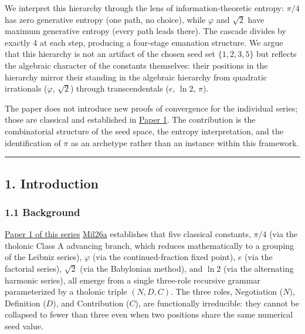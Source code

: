 \documentclass[
  11pt,
  letterpaper,
]{article}
\begin{document}
We interpret this hierarchy through the lens of information-theoretic
entropy: \(\pi/4\) has zero generative entropy (one path, no choice),
while \(\varphi\) and \(\sqrt{2}\) have maximum generative entropy
(every path leads there). The cascade divides by exactly 4 at each step,
producing a four-stage emanation structure. We argue that this hierarchy
is not an artifact of the chosen seed set \(\{1, 2, 3, 5\}\) but
reflects the algebraic character of the constants themselves: their
positions in the hierarchy mirror their standing in the algebraic
hierarchy from quadratic irrationals (\(\varphi\), \(\sqrt{2}\)) through
transcendentals (\(e\), \(\ln 2\), \(\pi\)).

The paper does not introduce new proofs of convergence for the
individual series; those are classical and established in
\href{https://github.com/baardev/truevalue/blob/main/docnav/Research/papers/1_recursive-tholonic-five-constants/1_recursive-tholonic-five-constants.pdf}{Paper
1}. The contribution is the combinatorial structure of the seed space,
the entropy interpretation, and the identification of \(\pi\) as an
archetype rather than an instance within this framework.

\begin{center}\rule{0.5\linewidth}{0.5pt}\end{center}

\subsection{1. Introduction}\label{introduction}

\subsubsection{1.1 Background}\label{background}

\href{https://github.com/baardev/truevalue/blob/main/docnav/Research/papers/1_recursive-tholonic-five-constants/1_recursive-tholonic-five-constants.pdf}{Paper
1 of this series}
\href{https://github.com/baardev/truevalue/blob/main/docnav/Research/papers/1_recursive-tholonic-five-constants/1_recursive-tholonic-five-constants.pdf}{Mil26a}
establishes that five classical constants, \(\pi/4\) (via the tholonic
Class A advancing branch, which reduces mathematically to a grouping of
the Leibniz series), \(\varphi\) (via the continued-fraction fixed
point), \(e\) (via the factorial series), \(\sqrt{2}\) (via the
Babylonian method), and \(\ln 2\) (via the alternating harmonic series),
all emerge from a single three-role recursive grammar parameterized by a
tholonic triple \((N, D, C)\). The three roles, Negotiation (\(N\)),
Definition (\(D\)), and Contribution (\(C\)), are functionally
irreducible: they cannot be collapsed to fewer than three even when two
positions share the same numerical seed value.
\end{document}
